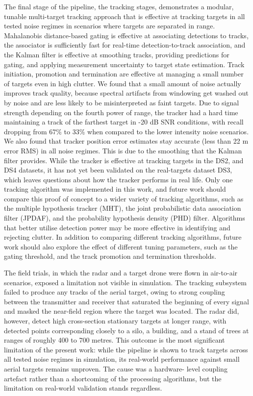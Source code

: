 The final stage of the pipeline, the tracking stages, demonstrates a modular, 
tunable multi-target tracking approach that is effective at tracking targets in 
all tested noise regimes in scenarios where targets are separated in range. 
Mahalanobis distance-based gating is effective at associating detections to
tracks, the associator is sufficiently fast for real-time detection-to-track 
association, and the Kalman filter is effective at smoothing tracks, providing
predictions for gating, and applying measurement uncertainty to target state 
estimation. Track initiation, promotion and termination are effective at
managing a small number of targets even in high clutter. We found that 
a small amount of noise actually improves track quality, because 
spectral artifacts from windowing get washed out by noise and are less
likely to be misinterpreted as faint targets. Due to signal strength 
depending on the fourth power of range, the tracker had a hard time 
maintaining a track of the farthest target in -20 dB SNR conditions, 
with recall dropping from 67\% to 33\% when compared to the lower intensity 
noise scenarios. We also found that tracker position error estimates 
stay accurate (less than 22 m error RMS) in all noise regimes. This is
due to the smoothing that the Kalman filter provides. While the tracker is
effective at tracking targets in the DS2, and DS4 datasets, it has not yet been 
validated on the real-targets dataset DS3, which leaves questions about how
the tracker performs in real life. Only one tracking algorithm was implemented in 
this work, and future work should compare this proof of concept to a wider
variety of tracking algorithms, such as the multiple hypothesis tracker (MHT),
the joint probabilistic data association filter (JPDAF), and the probability 
hypothesis density (PHD) filter. Algorithms that better utilise detection 
power may be more effective in identifying and rejecting clutter. 
In addition to comparing different tracking algorithms, future work should 
also explore the effect of different tuning parameters, such as the gating
threshold, and the track promotion and termination thresholds.  

The field trials, in which the radar and a target drone were flown in air-to-air 
scenarios, exposed a limitation not visible in simulation. The tracking subsystem 
failed to produce any tracks of the aerial target, owing to strong coupling between the 
transmitter and receiver that saturated the beginning of every signal and masked the 
near-field region where the target was located. The radar did, however, detect high 
cross-section stationary targets at longer range, with detected points corresponding 
closely to a silo, a building, and a stand of trees at ranges of roughly 400 to 700 
metres. 
This outcome is the most significant limitation of the present work: while the pipeline 
is shown to track targets across all tested noise regimes in simulation, its real-world 
performance against small aerial targets remains unproven. The cause was a hardware-
level coupling artefact rather than a shortcoming of the processing algorithms, but the 
limitation on real-world validation stands regardless.


